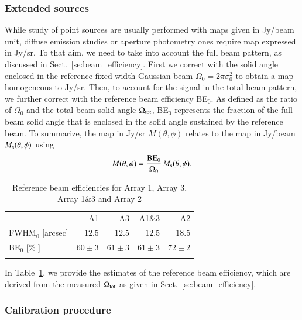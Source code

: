 \documentclass[traditionalabstract]{aa}
\newcommand{\rev}[1]{#1}
\begin{document}
\subsubsection{Extended sources}
\label{se:extended_source_calib}

{\rev While study of point sources are usually performed with maps given in
Jy/beam unit, diffuse emission studies or aperture photometry ones
require map expressed in Jy/sr. To that aim, we need to take into
account the full beam pattern, as discussed in Sect.~\ref{se:beam_efficiency}.}
First we correct with the solid angle enclosed in the
reference fixed-width Gaussian beam $\Omega_{0} = 2\pi \sigma_0^2$ to
obtain a map homogeneous to Jy/sr. Then, to account for the signal in
the total beam pattern, we further correct with the reference beam
efficiency BE$_{0}$. As defined as the ratio of $\Omega_{0}$ and the
total beam solid angle $\Omega_{\rm{tot}}$, BE$_{0}$ represents the
fraction of the full beam solid angle that is enclosed in the solid
angle sustained by the reference beam. To summarize, the map in Jy/sr
$M(\theta, \phi)$ relates to the map in Jy/beam
$M_{\rm{s}}(\theta, \phi)$ using
%
\begin{equation}
M(\theta, \phi) = \frac{\rm{BE}_{0}}{\Omega_{0}} \, M_{\rm{s}}(\theta, \phi).
\label{eq:jybeam_to_jysr}
\end{equation}
%
\begin{table}[!htbp]
  \caption[]{Reference beam efficiencies for Array 1, Array 3, Array 1\&3 and Array 2}
  \label{tab:reference_beam_efficiency}
  \centering    
  \begin{tabular}{lrrrr}
    \hline\hline
    \noalign{\smallskip}
    & A1 & A3  & A1\&3 & A2 \\
    \noalign{\smallskip}
    \hline
    \noalign{\smallskip}
    FWHM$_{0}$ [arcsec]          & $12.5$     &  $12.5$     & $12.5$     & $18.5$     \\
    BE$_{0}$   [\% ]             & $60 \pm 3$ &  $61 \pm 3$ & $61 \pm 3$ & $72 \pm 2$ \\
        \noalign{\smallskip}
    \hline
  \end{tabular}
\end{table}
%
{\rev In Table~\ref{tab:reference_beam_efficiency}, we provide the
estimates of the reference beam efficiency, which are derived from the
measured $\Omega_{\rm{tot}}$ as given in
Sect.~\ref{se:beam_efficiency}.}

\subsubsection{Calibration procedure}
\label{se:practical_calib}
\end{document}
